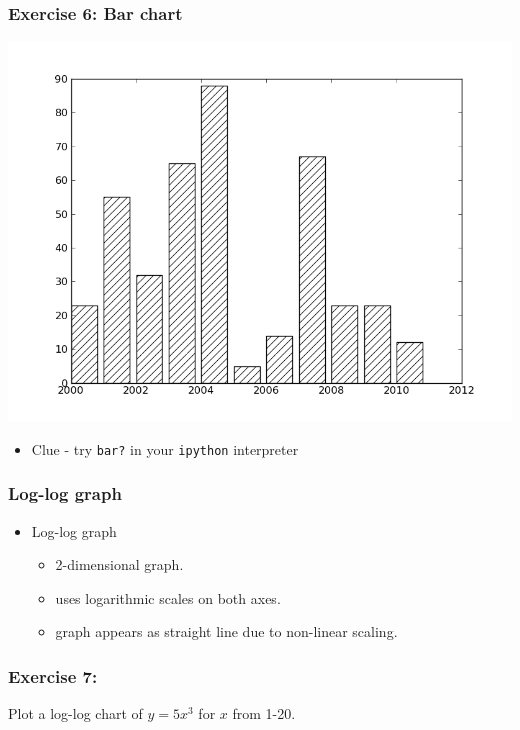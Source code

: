 \documentclass[17pt,compress]{beamer}
\begin{document}
\begin{frame}
\frametitle{Exercise 6: Bar chart}
\label{sec-15}
\begin{center}
\includegraphics[scale=0.3]{bar-chart-hatch.png}
\end{center}
\begin{itemize}
\item {Clue} - try \texttt{bar?} in your \texttt{ipython} interpreter
\end{itemize}
\end{frame}
\begin{frame}
\frametitle{Log-log graph}
\label{sec-16}
\begin{itemize}
\item Log-log graph
\begin{itemize}
\item 2-dimensional graph.\pause
\item uses logarithmic scales on both axes.\pause
\item graph appears as straight line due to non-linear scaling.
\end{itemize}
\end{itemize}
\end{frame}
\begin{frame}
\frametitle{Exercise 7:}
\label{sec-17}
Plot a log-log chart of $y = 5x^3$ for $x$ from 1-20.
\end{frame}
\end{document}
